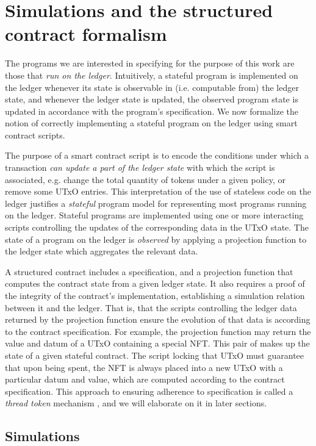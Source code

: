 \section{Simulations and the structured contract formalism}
\label{sec:struc}

The programs we are interested in specifying for the purpose of this work
are those that \emph{run on the ledger}. Intuitively, a stateful program is implemented
on the ledger whenever its state is observable in (i.e. computable from) the ledger state,
and whenever the ledger state is updated, the observed program state is updated in accordance
with the program's specification. We now formalize the notion of correctly implementing
a stateful program on the ledger using smart contract scripts.

The purpose of a smart contract script is to encode the conditions under which
a transaction \emph{can update a part of the ledger state} with which the script is
associated, e.g. change the total quantity of tokens under a given policy, or
remove some UTxO entries. This interpretation of the use of stateless
code on the ledger justifies a \emph{stateful} program model for representing
most programs running on the ledger. Stateful programs are implemented using one or more
interacting scripts controlling the updates of the corresponding data in the UTxO state.
The state of a program on the ledger is \emph{observed} by applying a projection
function to the ledger state which aggregates the relevant data.

A structured contract includes a specification, and a projection function
that computes the contract state from a given ledger state. It also requires
a proof of the integrity of the contract's implementation, establishing
a simulation relation between it and the ledger. That is, that the
scripts controlling the ledger data returned by the projection function
ensure the evolution of that data is according to the contract
specification. For example, the projection function may return the value and
datum of a UTxO containing a special NFT. This pair of makes up the state of
a given stateful contract. The script locking that UTxO
must guarantee that upon being spent, the NFT is always placed into a new UTxO
with a particular datum and value, which are computed according to the contract specification.
This approach to ensuring adherence to specification is called a \emph{thread token}
mechanism \cite{eutxoma}, and we will elaborate
on it in later sections.

\subsection{Simulations}

